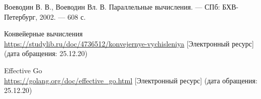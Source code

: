 


\begin{thebibliography}{8}

    Воеводин В. В., Воеводин Вл. В. Параллельные вычисления. — СПб: БХВ-Петербург, 2002. — 608 с.

    Конвейерные вычисления
    \\\url{https://studylib.ru/doc/4736512/konvejernye-vychisleniya}
    [Электронный ресурс] (дата обращения: 25.12.20)

    Effective Go
    \\\url{https://golang.org/doc/effective_go.html}
    [Электронный ресурс] (дата обращения: 25.12.20)

\end{thebibliography}